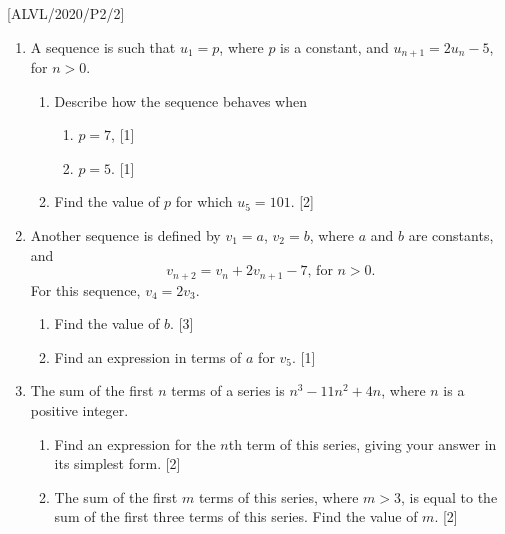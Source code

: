 \item {[}ALVL/2020/P2/2{]}
\begin{enumerate}
\item A sequence is such that $u_{1}=p$, where $p$ is a constant, and
$u_{n+1}=2u_{n}-5$, for $n>0$. 
\begin{enumerate}
\item Describe how the sequence behaves when 
\begin{enumerate}
\item $p=7$,\hfill{} {[}1{]}
\item $p=5$.\hfill{} {[}1{]}
\end{enumerate}
\item Find the value of $p$ for which $u_{5}=101$. \hfill{}{[}2{]}
\end{enumerate}
\item Another sequence is defined by $v_{1}=a$, $v_{2}=b$, where $a$
and $b$ are constants, and
\[
v_{n+2}=v_{n}+2v_{n+1}-7,\,\text{for }n>0.
\]
For this sequence, $v_{4}=2v_{3}$. 
\begin{enumerate}
\item Find the value of $b$.\hfill{} {[}3{]}
\item Find an expression in terms of $a$ for $v_{5}$. \hfill{}{[}1{]}
\end{enumerate}
\item The sum of the first $n$ terms of a series is $n^{3}-11n^{2}+4n$,
where $n$ is a positive integer. 
\begin{enumerate}
\item Find an expression for the $n$th term of this series, giving your
answer in its simplest form.\hfill{} {[}2{]}
\item The sum of the first $m$ terms of this series, where $m>3$, is equal
to the sum of the first three terms of this series. Find the value
of $m$.\hfill{} {[}2{]}
\end{enumerate}
\end{enumerate}
